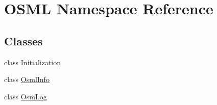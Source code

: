 \hypertarget{namespaceOSML}{}\section{O\+S\+ML Namespace Reference}
\label{namespaceOSML}
\subsection*{Classes}
\begin{DoxyCompactItemize}
\item 
class \mbox{\hyperlink{classOSML_1_1Initialization}{Initialization}}
\item 
class \mbox{\hyperlink{classOSML_1_1OsmlInfo}{Osml\+Info}}
\item 
class \mbox{\hyperlink{classOSML_1_1OsmLog}{Osm\+Log}}
\end{DoxyCompactItemize}

